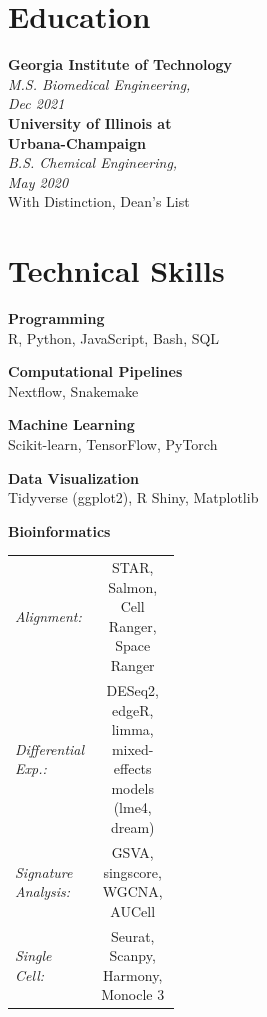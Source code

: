 \documentclass[letterpaper,11pt]{article}
\begin{document}
\setlength{\columnsep}{1.15cm}
\begin{paracol}{2}

\begin{leftcolumn}
\section*{Education}
\textbf{Georgia Institute of Technology} \\
\textit{\color{graytext} M.S. Biomedical Engineering, \\Dec 2021}
\vspace{6pt} \\
\textbf{University of Illinois at \\ Urbana-Champaign} \\
\textit{\color{graytext} B.S. Chemical Engineering, \\May 2020} \\
{\small With Distinction, Dean’s List}
\vspace{12pt}

\section*{Technical Skills}
\textbf{Programming} \\
R, Python, JavaScript, Bash, SQL
\vspace{3pt}

\textbf{Computational Pipelines} \\
Nextflow, Snakemake
\vspace{3pt}

\textbf{Machine Learning} \\
Scikit-learn, TensorFlow, PyTorch
\vspace{3pt}

\textbf{Data Visualization} \\
Tidyverse (ggplot2), R Shiny, Matplotlib

\textbf{Bioinformatics} \\
\renewcommand{\arraystretch}{2}
\begin{tabular}{p{0.33\linewidth} c}
    \textit{Alignment:} & \parbox[t]{0.67\linewidth}{\raggedright STAR, Salmon, Cell Ranger, Space Ranger} \\
    \textit{Differential Exp.:} & \parbox[t]{0.67\linewidth}{\raggedright DESeq2, edgeR, limma, mixed-effects models (lme4, dream)} \\
    \textit{Signature Analysis:} & \parbox[t]{0.67\linewidth}{\raggedright GSVA, singscore, WGCNA, AUCell} \\
    \textit{Single Cell:} & \parbox[t]{0.67\linewidth}{\raggedright Seurat, Scanpy, Harmony, Monocle 3} \\
    

\end{tabular}
\end{leftcolumn}
\end{paracol}
\end{document}

